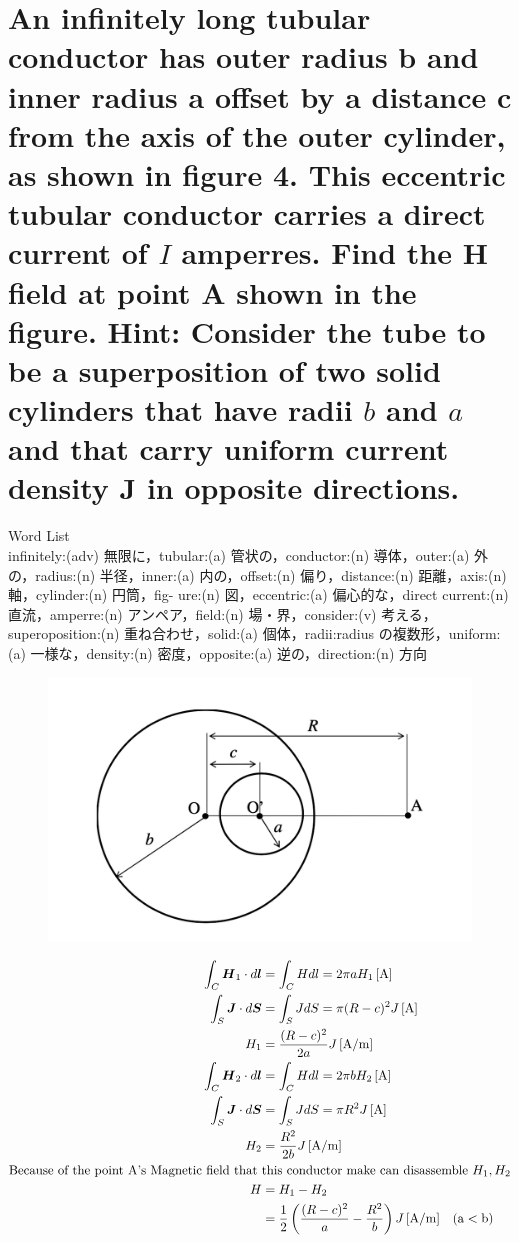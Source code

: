 \documentclass[dvipdfmx]{ujarticle}
\begin{document}
\section{An infinitely long tubular conductor has outer radius b and inner radius a offset by a distance c from the axis of the outer cylinder, as shown in figure 4. This eccentric tubular conductor carries a direct current of $I$ amperres. Find the H field at point A shown in the figure. Hint: Consider the tube to be a superposition of two solid cylinders that have radii $b$ and $a$ and that carry uniform current density J in opposite directions.}
Word List\\
infinitely:(adv) 無限に，tubular:(a) 管状の，conductor:(n) 導体，outer:(a) 外の，radius:(n) 半径，inner:(a) 内の，offset:(n) 偏り，distance:(n) 距離，axis:(n) 軸，cylinder:(n) 円筒，fig- ure:(n) 図，eccentric:(a) 偏心的な，direct current:(n) 直流，amperre:(n) アンペア，field:(n) 場・界，consider:(v) 考える，superoposition:(n) 重ね合わせ，solid:(a) 個体，radii:radius の複数形，uniform:(a) 一様な，density:(n) 密度，opposite:(a) 逆の，direction:(n) 方向
\begin{figure}[h]
	\centering
	\includegraphics[scale=0.35]{./fig/c.png}
	\caption{}
	\label{fig:c}
\end{figure}

\begin{align*}
	\int_{C}\boldsymbol{H}_{1}\cdot d\boldsymbol{l}&=\int_{C}Hdl=2\pi aH_{1}\,[\rm{A}]\\
	\int_{S}\boldsymbol{J}\cdot d\boldsymbol{S}&=\int_{S}JdS=\pi (R-c)^{2}J\,[\rm{A}]\\
	H_{1}&=\frac{(R-c)^{2}}{2a}J\,[\rm{A/m}]\\
	\int_{C}\boldsymbol{H}_{2}\cdot d\boldsymbol{l}&=\int_{C}Hdl=2\pi bH_{2}\,[\rm{A}]\\
	\int_{S}\boldsymbol{J}\cdot d\boldsymbol{S}&=\int_{S}JdS=\pi R^{2}J\,[\rm{A}]\\
	H_{2}&=\frac{R^{2}}{2b}J\,[\rm{A/m}]\\
	\text{Because of the point A's Magnetic field that }&\text{this conductor make can disassemble }H_{1}, H_{2}\\
	H&=H_{1}-H_{2}\\
	&=\frac{1}{2}\left(\frac{(R-c)^{2}}{a}-\frac{R^{2}}{b}\right)J\,[\rm{A/m}]\quad (a<b)
\end{align*}
\end{document}
